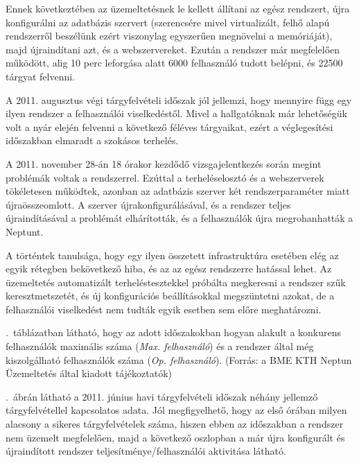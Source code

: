 Ennek következtében az üzemeltetésnek le kellett állítani az egész rendszert, újra konfigurálni az adatbázis szervert (szerencsére mivel virtualizált, felhő alapú rendszerről beszélünk ezért viszonylag egyszerűen megnövelni a memóriáját), majd újraindítani azt, és a webszervereket. Ezután a rendszer már megfelelően működött, alig 10 perc leforgása alatt 6000 felhasználó tudott belépni, és 22500 tárgyat felvenni.

A 2011. augusztus végi tárgyfelvételi időszak jól jellemzi, hogy mennyire függ egy ilyen rendszer a felhasználói viselkedéstől.  Mivel a hallgatóknak már lehetőségük volt a nyár elején felvenni a következő féléves tárgyaikat, ezért a véglegesítési időszakban elmaradt a szokásos terhelés.

A 2011. november 28-án 18 órakor kezdődő vizsgajelentkezés során megint problémák voltak a rendszerrel. Ezúttal a terheléselosztó és a webszerverek tökéletesen működtek, azonban az adatbázis szerver két rendszerparaméter miatt újraösszeomlott. A szerver újrakonfigurálásával, és a rendszer teljes újraindításával a problémát elhárították, és a felhasználók újra megrohanhatták a Neptunt.

A történtek tanulsága, hogy egy ilyen összetett infrastruktúra esetében elég az egyik rétegben bekövetkező hiba, és az az egész rendszerre hatással lehet. Az üzemeltetés automatizált terheléstesztekkel próbálta megkeresni a rendszer szűk keresztmetszetét, és új konfigurációs beállításokkal megszüntetni azokat, de a felhasználói viselkedést nem tudták egyik esetben sem előre meghatározni.

.~táblázatban látható, hogy az adott időszakokban hogyan alakult a konkurens felhasználók maximális száma (\textit{Max. felhasználó}) és a rendszer által még kiszolgálható felhasználók száma (\textit{Op. felhasználó}). (Forrás: a BME KTH Neptun Üzemeltetés által kiadott tájékoztatók)



.~ábrán látható a 2011. június havi tárgyfelvételi időszak néhány jellemző tárgyfelvétellel kapcsolatos adata. Jól megfigyelhető, hogy az első órában milyen alacsony a sikeres tárgyfelvételek száma, hiszen ebben az időszakban a rendszer nem üzemelt megfelelően, majd a következő oszlopban a már újra konfigurált és újraindított rendszer teljesítménye/felhasználói aktivitása látható.

